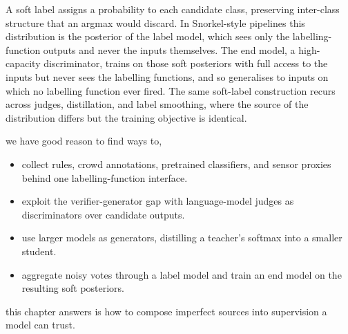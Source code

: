 A soft label assigns a probability to each candidate class,
preserving inter-class structure that an argmax would discard.
In Snorkel-style pipelines this distribution is the posterior of the label model,
which sees only the labelling-function outputs and never the inputs themselves.
The end model, a high-capacity discriminator, trains on those soft posteriors
with full access to the inputs but never sees the labelling functions,
and so generalises to inputs on which no labelling function ever fired.
The same soft-label construction recurs across judges, distillation, and label smoothing,
where the source of the distribution differs but the training objective is identical.


we have good reason to find ways to,
\begin{itemize}
    \item collect rules, crowd annotations, pretrained classifiers, and sensor proxies behind one labelling-function interface.
    \item exploit the verifier-generator gap with language-model judges as discriminators over candidate outputs.
    \item use larger models as generators, distilling a teacher's softmax into a smaller student.
    \item aggregate noisy votes through a label model and train an end model on the resulting soft posteriors.
\end{itemize}

 this chapter answers is how to compose
imperfect sources into supervision a model can trust.

\iffalse
